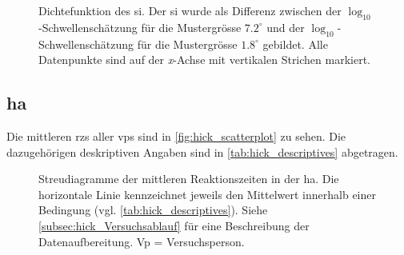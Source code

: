 \documentclass[11pt, twoside, a4paper]{book}		%
\begin{document}
\begin{figure}[htbp]
	\centering
	\begin{adjustbox}{width=1\textwidth}
		
	\end{adjustbox}
	\caption[Dichtefunktion des \gls{si}]{Dichtefunktion des \gls{si}. Der \gls{si} wurde als Differenz zwischen der $\log_{10}$-Schwellenschätzung für die Mustergrösse $7.2^{\circ}$ und der $\log_{10}$-Schwellenschätzung für die Mustergrösse $1.8^{\circ}$ gebildet. Alle Datenpunkte sind auf der \textit{x}-Achse mit vertikalen Strichen markiert.}
	\label{fig:suppression_index_density}
\end{figure}







\subsection{\gls{ha}}

Die mittleren \glspl{rz} aller \glspl{vp} sind in  \autoref{fig:hick_scatterplot} zu sehen.
Die dazugehörigen deskriptiven Angaben sind in  \autoref{tab:hick_descriptives} abgetragen. 

\begin{figure}[p]
	\centering
	\begin{adjustbox}{width=1\textwidth}
		
	\end{adjustbox}
	\caption[Hick-Aufgabe-Streudiagramm]{Streudiagramme der mittleren Reaktionszeiten in der \gls{ha}. Die horizontale Linie kennzeichnet jeweils den Mittelwert innerhalb einer Bedingung (vgl. \autoref{tab:hick_descriptives}). Siehe \autoref{subsec:hick_Versuchsablauf} für eine Beschreibung der Datenaufbereitung. Vp = Versuchsperson.}
	\label{fig:hick_scatterplot}
\end{figure}
\end{document}

